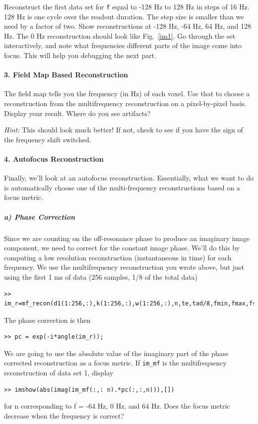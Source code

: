 \documentclass[11pt]{article}
\begin{document}
Reconstruct the first data set for \verb+f+ equal to  -128 Hz to 128 Hz in steps of 16 Hz.  128 Hz is one cycle over the readout duration.  The step size is smaller than we need by a factor of two.  Show reconstructions at -128 Hz, -64 Hz, 64 Hz, and 128 Hz.  The 0 Hz reconstruction should look like Fig.~\ref{im1}.  Go through the set interactively, and note what frequencies different parts of the image come into focus.  This will help you debugging the next part.

\paragraph*{3. Field Map Based Reconstruction}

The field map tells you the frequency  (in Hz) of each voxel.  Use that to choose a reconstruction from the multifrequency reconstruction on a pixel-by-pixel basis.  Display your result. Where do you see artifacts?

{\em Hint: } This should look much better!  If not, check to see if you have the sign of the frequency shift switched.


\paragraph*{4. Autofocus Reconstruction}

Finally, we'll look at an autofocus reconstruction.   Essentially, what we want to do is automatically choose one of the multi-frequency reconstructions based on a focus metric.

\subparagraph{a) Phase Correction} 
Since we are counting on the off-resonance phase to produce an imaginary image component, we need to correct for the constant image phase.  We'll do this by computing a low resolution reconstruction (instantaneous in time) for each frequency.  We use the multifrequency reconstruction you wrote above, but just using the first 1 ms of data (256 samples, 1/8 of the total data) 
\begin{verbatim}
>> im_r=mf_recon(d1(1:256,:),k(1:256,:),w(1:256,:),n,te,tad/8,fmin,fmax,fstep);
\end{verbatim}
The phase correction is then
\begin{verbatim}
>> pc = exp(-i*angle(im_r));
\end{verbatim}
We are going to use the absolute value of the imaginary part of the phase corrected reconstruction as a focus metric.  If \verb+im_mf+ is the multifrequency reconstruction of data set 1, display
\begin{verbatim}
>> imshow(abs(imag(im_mf(:,: n).*pc(:,:,n))),[])
\end{verbatim}
for n corresponding to f = -64 Hz,  0 Hz,  and 64 Hz.  Does the focus metric decrease when the frequency is correct?
\end{document}
